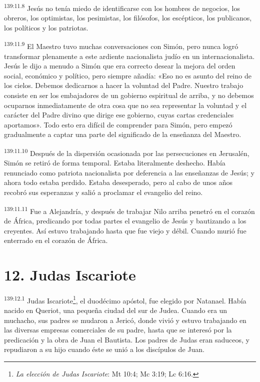 \par 
\textsuperscript{139:11.8} Jesús no tenía miedo de identificarse con los hombres de negocios, los obreros, los optimistas, los pesimistas, los filósofos, los escépticos, los publicanos, los políticos y los patriotas.

\par 
\textsuperscript{139:11.9} El Maestro tuvo muchas conversaciones con Simón, pero nunca logró transformar plenamente a este ardiente nacionalista judío en un internacionalista. Jesús le dijo a menudo a Simón que era correcto desear la mejora del orden social, económico y político, pero siempre añadía: «Eso no es asunto del reino de los cielos. Debemos dedicarnos a hacer la voluntad del Padre. Nuestro trabajo consiste en ser los embajadores de un gobierno espiritual de arriba, y no debemos ocuparnos inmediatamente de otra cosa que no sea representar la voluntad y el carácter del Padre divino que dirige ese gobierno, cuyas cartas credenciales aportamos». Todo esto era difícil de comprender para Simón, pero empezó gradualmente a captar una parte del significado de la enseñanza del Maestro.

\par 
\textsuperscript{139:11.10} Después de la dispersión ocasionada por las persecuciones en Jerusalén, Simón se retiró de forma temporal. Estaba literalmente deshecho. Había renunciado como patriota nacionalista por deferencia a las enseñanzas de Jesús; y ahora todo estaba perdido. Estaba desesperado, pero al cabo de unos años recobró sus esperanzas y salió a proclamar el evangelio del reino.

\par 
\textsuperscript{139:11.11} Fue a Alejandría, y después de trabajar Nilo arriba penetró en el corazón de África, predicando por todas partes el evangelio de Jesús y bautizando a los creyentes. Así estuvo trabajando hasta que fue viejo y débil. Cuando murió fue enterrado en el corazón de
África.

\section*{12. Judas Iscariote}
\par 
\textsuperscript{139:12.1} Judas Iscariote\footnote{\textit{La elección de Judas Iscariote}: Mt 10:4; Mc 3:19; Lc 6:16.}, el duodécimo apóstol, fue elegido por Natanael. Había nacido en Queriot, una pequeña ciudad del sur de Judea. Cuando era un muchacho, sus padres se mudaron a Jericó, donde vivió y estuvo trabajando en las diversas empresas comerciales de su padre, hasta que se interesó por la predicación y la obra de Juan el Bautista. Los padres de Judas eran saduceos, y repudiaron a su hijo cuando éste se unió a los discípulos de Juan.

